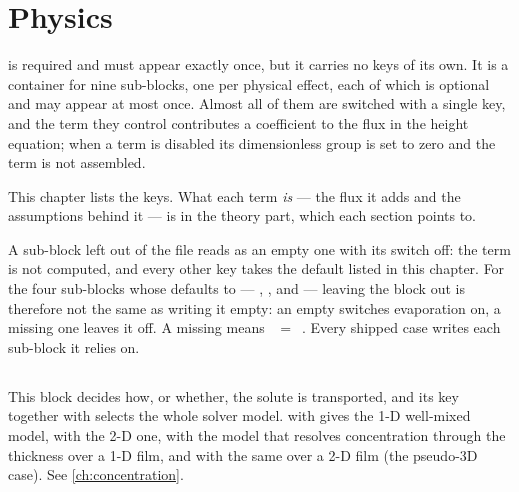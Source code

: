 \chapter{Physics}
\label{ch:ref-physics}

 is required and must appear exactly once, but it carries no keys
of its own. It is a container for nine sub-blocks, one per physical effect,
each of which is optional and may appear at most once. Almost all of them are
switched with a single  key, and the term they control contributes
a coefficient to the flux in the height equation; when a term is disabled its
dimensionless group is set to zero and the term is not assembled.

This chapter lists the keys. What each term \emph{is} --- the flux it adds and
the assumptions behind it --- is in the theory part, which each section points
to.

\begin{note}
  A sub-block left out of the file reads as an empty one with its switch
  off: the term is not computed, and every other key takes the default listed
  in this chapter. For the four sub-blocks whose  defaults to
   --- , ,
   and  --- leaving the block out is therefore
  not the same as writing it empty: an empty 
  switches evaporation on, a missing one leaves it off. A missing
   means ~$=$~. Every shipped case
  writes each sub-block it relies on.
\end{note}

\section{}
\label{sec:ref-physics:concfield}

This block decides how, or whether, the solute is transported, and its
 key together with  selects the whole solver
model.  with  gives the 1-D well-mixed model,  with
 the 2-D one,  with  the model that resolves
concentration through the thickness over a 1-D film, and  with
 the same over a 2-D film (the pseudo-3D case).
See \cref{ch:concentration}.

